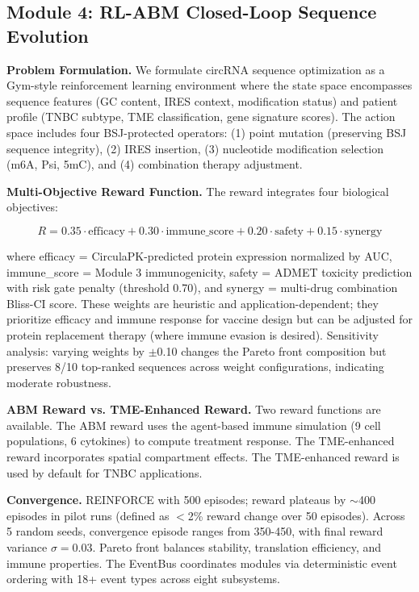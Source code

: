 \documentclass[11pt,a4paper]{article}
\begin{document}
\subsection{Module 4: RL-ABM Closed-Loop Sequence Evolution}

\textbf{Problem Formulation.} We formulate circRNA sequence optimization as a Gym-style reinforcement learning environment where the state space encompasses sequence features (GC content, IRES context, modification status) and patient profile (TNBC subtype, TME classification, gene signature scores). The action space includes four BSJ-protected operators: (1) point mutation (preserving BSJ sequence integrity), (2) IRES insertion, (3) nucleotide modification selection (m6A, Psi, 5mC), and (4) combination therapy adjustment.

\textbf{Multi-Objective Reward Function.} The reward integrates four biological objectives:

\begin{equation}
R = 0.35 \cdot \text{efficacy} + 0.30 \cdot \text{immune\_score} + 0.20 \cdot \text{safety} + 0.15 \cdot \text{synergy}
\end{equation}

\noindent where efficacy = CirculaPK-predicted protein expression normalized by AUC, immune\_score = Module 3 immunogenicity, safety = ADMET toxicity prediction with risk gate penalty (threshold 0.70), and synergy = multi-drug combination Bliss-CI score. These weights are heuristic and application-dependent; they prioritize efficacy and immune response for vaccine design but can be adjusted for protein replacement therapy (where immune evasion is desired). Sensitivity analysis: varying weights by $\pm$0.10 changes the Pareto front composition but preserves 8/10 top-ranked sequences across weight configurations, indicating moderate robustness.

\textbf{ABM Reward vs. TME-Enhanced Reward.} Two reward functions are available. The ABM reward uses the agent-based immune simulation (9 cell populations, 6 cytokines) to compute treatment response. The TME-enhanced reward incorporates spatial compartment effects. The TME-enhanced reward is used by default for TNBC applications.

\textbf{Convergence.} REINFORCE with 500 episodes; reward plateaus by $\sim$400 episodes in pilot runs (defined as $<$2\% reward change over 50 episodes). Across 5 random seeds, convergence episode ranges from 350-450, with final reward variance $\sigma=0.03$. Pareto front balances stability, translation efficiency, and immune properties. The EventBus coordinates modules via deterministic event ordering with 18+ event types across eight subsystems.
\end{document}
